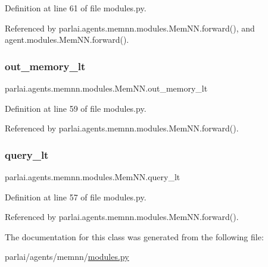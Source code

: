 Definition at line 61 of file modules.\+py.



Referenced by parlai.\+agents.\+memnn.\+modules.\+Mem\+N\+N.\+forward(), and agent.\+modules.\+Mem\+N\+N.\+forward().

\mbox{\label{classparlai_1_1agents_1_1memnn_1_1modules_1_1MemNN_a9eecf9c267fd2c15ba376a1bac3a9cc5}} 
\subsubsection{\texorpdfstring{out\+\_\+memory\+\_\+lt}{out\_memory\_lt}}
{\footnotesize\ttfamily parlai.\+agents.\+memnn.\+modules.\+Mem\+N\+N.\+out\+\_\+memory\+\_\+lt}



Definition at line 59 of file modules.\+py.



Referenced by parlai.\+agents.\+memnn.\+modules.\+Mem\+N\+N.\+forward().

\mbox{\label{classparlai_1_1agents_1_1memnn_1_1modules_1_1MemNN_aa6b47d1470856e76a31e266a049da848}} 
\subsubsection{\texorpdfstring{query\+\_\+lt}{query\_lt}}
{\footnotesize\ttfamily parlai.\+agents.\+memnn.\+modules.\+Mem\+N\+N.\+query\+\_\+lt}



Definition at line 57 of file modules.\+py.



Referenced by parlai.\+agents.\+memnn.\+modules.\+Mem\+N\+N.\+forward().



The documentation for this class was generated from the following file\+:\begin{DoxyCompactItemize}
\item 
parlai/agents/memnn/\hyperlink{parlai_2agents_2memnn_2modules_8py}{modules.\+py}\end{DoxyCompactItemize}
